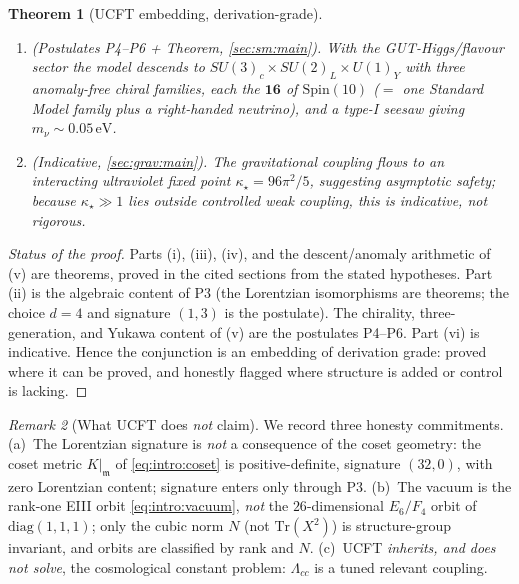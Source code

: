 \documentclass[11pt]{article}
\theoremstyle{plain}
\newtheorem{theorem}{Theorem}[section]
\theoremstyle{definition}
\theoremstyle{remark}
\newtheorem{remark}[theorem]{Remark}
\begin{document}
\begin{theorem}[UCFT embedding, derivation-grade]
\begin{enumerate}[label=\textup{(\roman*)}]
\begin{equation}
      \beta_{\hat g^{2}}\;=\;2\,\hat g^{2}\;+\;\frac{b_0}{48\pi^{2}}\,\hat g^{4},
      \qquad
      b_0=\tfrac{11}{3}C_A-\tfrac{4}{3}T\,n_F-\tfrac{1}{6}T\,n_S,
      \label{eq:intro:betag}
    \end{equation}
    with $C_A(\mathrm{Spin}(10))=8$, $T(\mathbf{16})=2$,
    $C_2(\mathbf{16})=45/8$; $b_0=26$ for one generation and $b_0=38$ for three.
    There is no interacting gauge fixed point; the UV is Gaussian,
    $\hat g^{2}_\star=0$.
  \item \textnormal{(Postulates P4--P6 + Theorem, \autoref{sec:sm:main}).} With
    the GUT-Higgs/flavour sector the model descends to
    $SU(3)_c\times SU(2)_L\times U(1)_Y$ with three anomaly-free chiral families,
    each the $\mathbf{16}$ of $\mathrm{Spin}(10)$ ($=$ one Standard Model family
    plus a right-handed neutrino), and a type-I seesaw giving
    $m_\nu\sim 0.05\,\mathrm{eV}$.
  \item \textnormal{(Indicative, \autoref{sec:grav:main}).} The gravitational
    coupling flows to an interacting ultraviolet fixed point
    $\kappa_\star=96\pi^{2}/5$, suggesting asymptotic safety; because
    $\kappa_\star\gg 1$ lies outside controlled weak coupling, this is
    indicative, not rigorous.
\end{enumerate}
\end{theorem}

\begin{proof}[Status of the proof]
Parts (i), (iii), (iv), and the descent/anomaly arithmetic of (v) are theorems,
proved in the cited sections from the stated hypotheses. Part (ii) is the
algebraic content of P3 (the Lorentzian isomorphisms are theorems; the choice
$d=4$ and signature $(1,3)$ is the postulate). The chirality, three-generation,
and Yukawa content of (v) are the postulates P4--P6. Part (vi) is indicative.
Hence the conjunction is an embedding of derivation grade: proved where it can
be proved, and honestly flagged where structure is added or control is lacking.
\end{proof}

\begin{remark}[What UCFT does \emph{not} claim]\label{rem:intro:caveats}
We record three honesty commitments. (a)~The Lorentzian signature is \emph{not}
a consequence of the coset geometry: the coset metric $K|_{\mathfrak{m}}$ of
\eqref{eq:intro:coset} is positive-definite, signature $(32,0)$, with zero
Lorentzian content; signature enters only through P3. (b)~The vacuum is the
rank-one EIII orbit \eqref{eq:intro:vacuum}, \emph{not} the $26$-dimensional
$E_6/F_4$ orbit of $\mathrm{diag}(1,1,1)$; only the cubic norm $N$ (not
$\mathrm{Tr}(X^2)$) is structure-group invariant, and orbits are classified by
rank and $N$. (c)~UCFT \emph{inherits, and does not solve}, the cosmological
constant problem: $\Lambda_{cc}$ is a tuned relevant coupling.
\end{remark}
\end{document}
